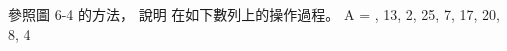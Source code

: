 \startEXERCISE
參照圖 6-4 的方法，
說明  在如下數列上的操作過程。
\startformula
A = , 13, 2, 25, 7, 17, 20, 8, 4 \rangle
\stopformula
\stopEXERCISE

\startANSWER
\startcombination[4*3]
{\externalfigure[e6_4_1-1]}{}
{\externalfigure[e6_4_1-2]}{}
{\externalfigure[e6_4_1-3]}{}
{\externalfigure[e6_4_1-4]}{}
{\externalfigure[e6_4_1-5]}{}
{\externalfigure[e6_4_1-6]}{}
{\externalfigure[e6_4_1-7]}{}
{\externalfigure[e6_4_1-8]}{}
{\externalfigure[e6_4_1-9]}{}
\stopcombination
\stopANSWER
